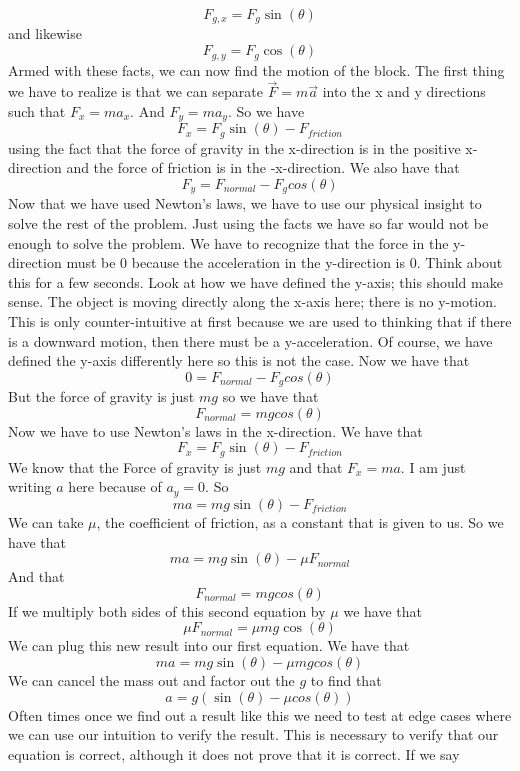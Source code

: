 \documentclass{article}[gray]
\numberwithin{equation}{subsection}
\begin{document}
\begin{equation}F_{g,x}=F_{g}\sin\left(\theta \right)\end{equation} and likewise \begin{equation}F_{g,y}=F_{g}\cos\left(\theta\right)\end{equation} Armed with these facts, we can now find the motion of the block. The first thing we have to realize is that we can separate $\vec{F}=m\vec{a}$ into the x and y directions such that $F_x=ma_x$. And  $F_y=ma_y$.  So we have \begin{equation}F_x= F_{g}\sin\left(\theta\right)-F_{friction}\end{equation} using the fact that the force of gravity in the x-direction is in the positive x-direction and the force of friction is in the -x-direction. We also have that \begin{equation}F_y=F_{normal}-F_{g}cos\left(\theta\right)\end{equation} Now that we have used Newton's laws, we have to use our physical insight to solve the rest of the problem. Just using the facts we have so far would not be enough to solve the problem. We have to recognize that the force in the y-direction must be 0 because the acceleration in the y-direction is 0. Think about this for a few seconds. Look at how we have defined the y-axis; this should make sense. The object is moving directly along the x-axis here; there is no y-motion. This is only counter-intuitive at first because we are used to thinking that if there is a downward motion, then there must be a y-acceleration. Of course, we have defined the y-axis differently here so this is not the case. Now we have that \begin{equation}0=F_{normal}-F_{g}cos\left(\theta\right)\end{equation} But the force of gravity is just $mg$ so we have that $$F_{normal}=mgcos\left(\theta\right)$$ Now we have to use Newton’s laws in the x-direction. We have that  $$F_x=F_{g}\sin\left(\theta \right)-F_{friction}$$ We know that the Force of gravity is just $mg$ and that $F_x=ma$. I am just writing $a$ here because of $a_y=0$. So $$ma=mg\sin\left(\theta \right)-F_{friction}$$ We can take $\mu$, the coefficient of friction, as a constant that is given to us. So we have that $$ma=mg\sin\left(\theta \right)-\mu F_{normal}$$ And that $$F_{normal}=mgcos\left(\theta \right)$$ If we multiply both sides of this second equation by $\mu$ we have that $$\mu F_{normal}=\mu mg\cos\left(\theta \right)$$ We can plug this new result into our first equation. We have that \begin{equation}ma=mg\sin\left(\theta \right)-\mu mgcos\left(\theta \right)\end{equation} We can cancel the mass out and factor out the $g$ to find that \begin{equation}a=g\left(\sin\left(\theta \right)-\mu cos\left(\theta \right)\right)\end{equation}Often times once we find out a result like this we need to test at edge cases where we can use our intuition to verify the result. This is necessary to verify that our equation is correct, although it does not prove that it is correct. If we say 
\end{document}
